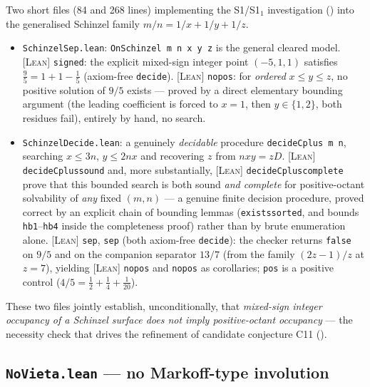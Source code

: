 \documentclass[11pt]{article}
\theoremstyle{plain}
\theoremstyle{definition}
\theoremstyle{remark}
\newcommand{\LEAN}{\textcolor{proved}{\textsc{[Lean]}}}
\newcommand{\file}[1]{\texttt{#1}}
\newcommand{\lean}[1]{\texttt{#1}}
\renewcommand{\_}{\textunderscore\allowbreak}
\begin{document}
Two short files (84 and 268 lines) implementing the S1/S1$_1$ investigation
() into the generalised Schinzel family $m/n=1/x+1/y+1/z$.
\begin{itemize}[leftmargin=1.4em]
  \item \file{SchinzelSep.lean}: \lean{OnSchinzel m n x y z} is the general cleared model.
        \LEAN{} \lean{signed\_9\_5}: the explicit mixed-sign integer point $(-5,1,1)$ satisfies
        $\tfrac95=1+1-\tfrac15$ (axiom-free \texttt{decide}). \LEAN{} \lean{no\_pos\_9\_5}: for
        \emph{ordered} $x\le y\le z$, no positive solution of $9/5$ exists — proved by a direct
        elementary bounding argument (the leading coefficient is forced to $x=1$, then
        $y\in\{1,2\}$, both residues fail), entirely by hand, no search.
  \item \file{SchinzelDecide.lean}: a genuinely \emph{decidable} procedure
        \lean{decideCplus m n}, searching $x\le 3n$, $y\le 2nx$ and recovering $z$ from
        $nxy=zD$. \LEAN{} \lean{decideCplus\_sound} and, more substantially,
        \LEAN{} \lean{decideCplus\_complete} prove that this bounded search is both sound
        \emph{and complete} for positive-octant solvability of \emph{any} fixed $(m,n)$ — a
        genuine finite decision procedure, proved correct by an explicit chain of bounding
        lemmas (\lean{exists\_sorted}, and bounds \texttt{hb1}--\texttt{hb4} inside the
        completeness proof) rather than by brute enumeration alone.
        \LEAN{} \lean{sep\_9\_5}, \lean{sep\_13\_7} (both axiom-free \texttt{decide}): the
        checker returns \texttt{false} on $9/5$ and on the companion separator $13/7$ (from the
        family $(2z-1)/z$ at $z=7$), yielding \LEAN{} \lean{no\_pos\_9\_5} and
        \lean{no\_pos\_13\_7} as corollaries; \lean{pos\_4\_5} is a positive control
        ($4/5=\tfrac12+\tfrac14+\tfrac1{20}$).
\end{itemize}
These two files jointly establish, unconditionally, that \emph{mixed-sign integer occupancy of
a Schinzel surface does not imply positive-octant occupancy} — the necessity check that drives
the refinement of candidate conjecture C11 ().

\subsection{\file{NoVieta.lean} — no Markoff-type involution}
\label{subsec:novieta}
\end{document}
